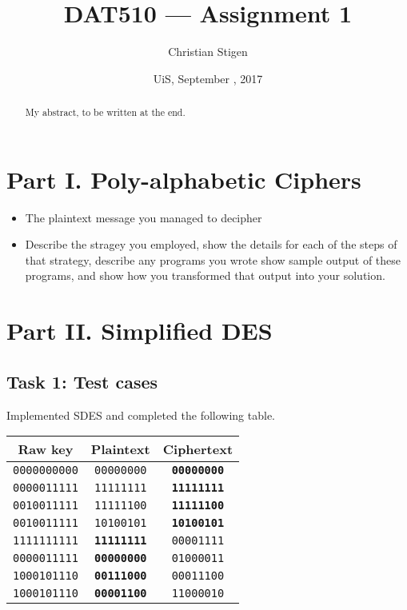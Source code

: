 \documentclass[a4paper,english,12pt]{article}
\title{DAT510 --- Assignment 1}
\author{Christian Stigen}
\date{UiS, September \nth{18}, 2017}
\begin{document}
\maketitle

\begin{abstract}
My abstract, to be written at the end.
\end{abstract}

\section{Part I. Poly-alphabetic Ciphers}

\begin{itemize}
  \item The plaintext message you managed to decipher
  \item Describe the stragey you employed, show the details for each of the
    steps of that strategy, describe any programs you wrote show sample output
    of these programs, and show how you transformed that output into your
    solution.
\end{itemize}

\section{Part II. Simplified DES}

\subsection{Task 1: Test cases}

Implemented SDES and completed the following table.

\begin{table}[H]
  \centering
  \begin{tabular}{ccc}
    \hline \textbf{Raw key} &
           \textbf{Plaintext} &
           \textbf{Ciphertext} \\
    \hline
    \texttt{0000000000} & \texttt{00000000} & \texttt{\textbf{00000000}} \\
    \texttt{0000011111} & \texttt{11111111} & \texttt{\textbf{11111111}} \\
    \texttt{0010011111} & \texttt{11111100} & \texttt{\textbf{11111100}} \\
    \texttt{0010011111} & \texttt{10100101} & \texttt{\textbf{10100101}} \\
    \texttt{1111111111} & \texttt{\textbf{11111111}} & \texttt{00001111} \\
    \texttt{0000011111} & \texttt{\textbf{00000000}} & \texttt{01000011} \\
    \texttt{1000101110} & \texttt{\textbf{00111000}} & \texttt{00011100} \\
    \texttt{1000101110} & \texttt{\textbf{00001100}} & \texttt{11000010} \\
    \hline
  \end{tabular}
  \label{table:task1}
\end{table}
\end{document}
